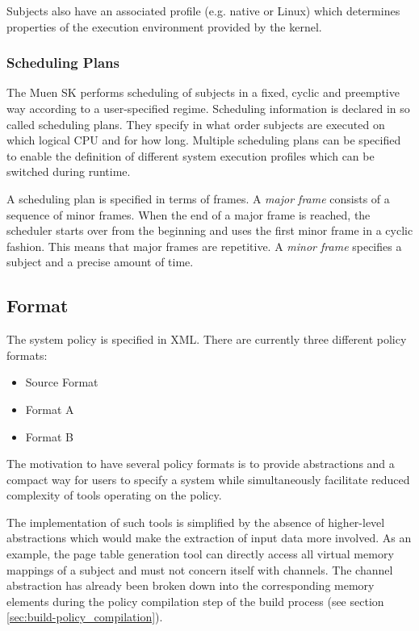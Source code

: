 \documentclass[a4paper,twoside,titlepage]{article}
\begin{document}
Subjects also have an associated profile (e.g. native or Linux) which determines
properties of the execution environment provided by the kernel.

\subsubsection{Scheduling Plans}
The Muen SK performs scheduling of subjects in a fixed, cyclic and
preemptive way according to a user-specified regime. Scheduling information is
declared in so called scheduling plans. They specify in what order subjects are
executed on which logical CPU and for how long. Multiple scheduling plans can be
specified to enable the definition of different system execution profiles which
can be switched during runtime.

A scheduling plan is specified in terms of frames. A \emph{major frame} consists
of a sequence of minor frames. When the end of a major frame is reached, the
scheduler starts over from the beginning and uses the first minor frame in a
cyclic fashion. This means that major frames are repetitive. A
\emph{minor frame} specifies a subject and a precise amount of time.

\subsection{Format}
The system policy is specified in XML. There are currently three different
policy formats:

\begin{itemize}
	\item Source Format
	\item Format A
	\item Format B
\end{itemize}

The motivation to have several policy formats is to provide abstractions and a
compact way for users to specify a system while simultaneously facilitate
reduced complexity of tools operating on the policy.

The implementation of such tools is simplified by the absence of higher-level
abstractions which would make the extraction of input data more involved. As
an example, the page table generation tool can directly access all virtual
memory mappings of a subject and must not concern itself with channels. The
channel abstraction has already been broken down into the corresponding memory
elements during the policy compilation step of the build process (see
section \ref{sec:build-policy_compilation}).
\end{document}
